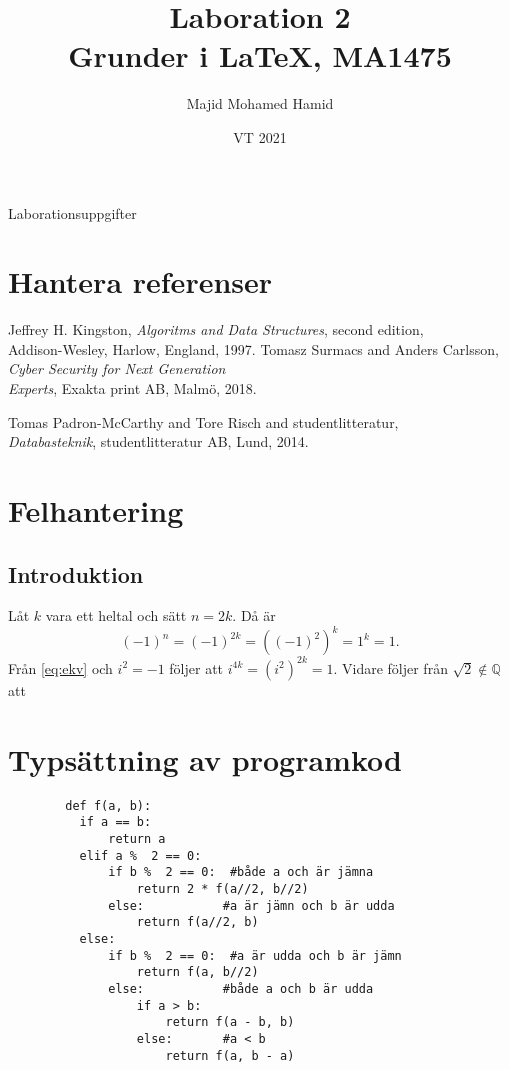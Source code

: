 \documentclass[a4paper, titlepage]{article}
\title{Laboration 2\\Grunder i \LaTeX, MA1475}%
\author{Majid Mohamed Hamid}
\date{VT 2021}
\begin{document}
	\maketitle
	\begin{center} 
		Laborationsuppgifter 
	\end{center}
	
	\section{Hantera referenser}

	
	\begin{thebibliography}{0}
		 Jeffrey H. 
Kingston, \emph{Algoritms and Data Structures}, second edition,\\ Addison-Wesley, Harlow, England, 1997.		
		 Tomasz Surmacs and Anders Carlsson, \emph{Cyber Security for Next Generation\\Experts}, Exakta print AB, Malmö, 2018.
		
		 Tomas Padron-McCarthy and Tore Risch and studentlitteratur, \\\emph{Databasteknik}, studentlitteratur AB, Lund, 2014. 
	\end{thebibliography}
	
	\section{Felhantering}

	\subsection*{Introduktion}

	Låt $k$ vara ett heltal och sätt $n = 2k$. 
Då är	\begin{equation}\label{eq:ekv}
		(-1)^n = (-1)^{2k} = ((-1)^2)^k = 1^k = 1.
	\end{equation}
	Från \ref{eq:ekv} och $i^2 = -1$ följer att $i^{4k} = (i^2)^{2k} = 1.$ 
	Vidare följer från $\sqrt{2} \notin \mathbb{Q}$ att
	
	
	\section{Typsättning av programkod}

	\begin{verbatim}
		def f(a, b):
		  if a == b:
		      return a
		  elif a %  2 == 0:
		      if b %  2 == 0:  #både a och är jämna
		          return 2 * f(a//2, b//2)
		      else:           #a är jämn och b är udda
		          return f(a//2, b)
		  else:
		      if b %  2 == 0:  #a är udda och b är jämn
		          return f(a, b//2)
		      else:           #både a och b är udda
		          if a > b:
		              return f(a - b, b)
		          else:       #a < b
		              return f(a, b - a)
	\end{verbatim}                
	
\end{document}
